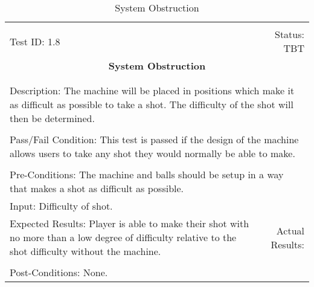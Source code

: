 \documentclass[titlepage]{article}
\begin{document}
\begin{center}%
\begin{table}
\begin{tabular}{|l r|}\hline&\\[-2mm]
	Test ID: 1.8	&Status: TBT\\[-3mm]
	\multicolumn{2}{|c|}{\textbf{\large{System Obstruction}}}\\&\\\hline&\\[-3mm]
	\multicolumn{2}{|p{\textwidth}|}{Description: The machine will be placed in positions which make it as difficult as possible to take a shot. The difficulty of the shot will then be determined.}\\[1mm]\hline&\\[-3mm]
	\multicolumn{2}{|p{\textwidth}|}{Pass/Fail Condition: This test is passed if the design of the machine allows users to take any shot they would normally be able to make.}\\[1mm]\hline&\\[-3mm]
	\multicolumn{2}{|p{\textwidth}|}{Pre-Conditions: The machine and balls should be setup in a way that makes a shot as difficult as possible.}\\[4mm]
	\multicolumn{2}{|p{\textwidth}|}{Input: Difficulty of shot.}\\[2mm]\hline
	\multicolumn{1}{|p{0.49\textwidth}}{Expected Results: Player is able to make their shot with no more than a low degree of difficulty relative to the shot difficulty without the machine.}	&\multicolumn{1}{|p{0.45\textwidth}|}{Actual Results:}\\\hline&\\[-3mm]
	\multicolumn{2}{|p{\textwidth}|}{Post-Conditions: None.}\\\hline
\end{tabular}
\caption{System Obstruction}
\end{table}
\end{center}
\end{document}
